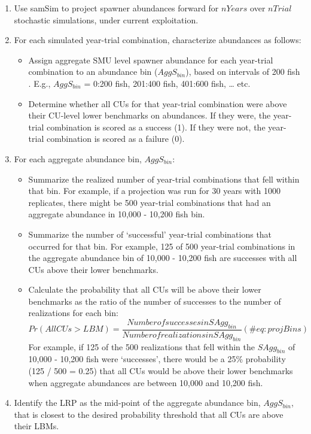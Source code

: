 \documentclass[
]{article}
\begin{document}
\begin{enumerate}
\def\labelenumi{\arabic{enumi}.}
\item
  Use samSim to project spawner abundances forward for \(nYears\) over
  \(nTrial\) stochastic simulations, under current exploitation.
\item
  For each simulated year-trial combination, characterize abundances as
  follows:

  \begin{itemize}
  \item
    Assign aggregate SMU level spawner abundance for each year-trial
    combination to an abundance bin (\(AggS_{bin}\)), based on intervals
    of 200 fish . E.g., \(AggS_{bin}\) = 0:200 fish, 201:400 fish,
    401:600 fish, \ldots{} etc.
  \item
    Determine whether all CUs for that year-trial combination were above
    their CU-level lower benchmarks on abundances. If they were, the
    year-trial combination is scored as a success (1). If they were not,
    the year-trial combination is scored as a failure (0).
  \end{itemize}
\item
  For each aggregate abundance bin, \(AggS_{bin}\):

  \begin{itemize}
  \item
    Summarize the realized number of year-trial combinations that fell
    within that bin. For example, if a projection was run for 30 years
    with 1000 replicates, there might be 500 year-trial combinations
    that had an aggregate abundance in 10,000 - 10,200 fish bin.
  \item
    Summarize the number of `successful' year-trial combinations that
    occurred for that bin. For example, 125 of 500 year-trial
    combinations in the aggregate abundance bin of 10,000 - 10,200 fish
    are successes with all CUs above their lower benchmarks.
  \item
    Calculate the probability that all CUs will be above their lower
    benchmarks as the ratio of the number of successes to the number of
    realizations for each bin: \begin{equation}
     Pr(All CUs > LBM) = \frac{Number of successes in SAgg_{bin}} {Number of realizations in SAgg_{bin}}
     (\#eq:projBins)
    \end{equation} For example, if 125 of the 500 realizations that fell
    within the \(SAgg_{bin}\) of 10,000 - 10,200 fish were `successes',
    there would be a 25\% probability (125 / 500 = 0.25) that all CUs
    would be above their lower benchmarks when aggregate abundances are
    between 10,000 and 10,200 fish.
  \end{itemize}
\item
  Identify the LRP as the mid-point of the aggregate abundance bin,
  \(AggS_{bin}\), that is closest to the desired probability threshold
  that all CUs are above their LBMs.
\end{enumerate}
\end{document}
